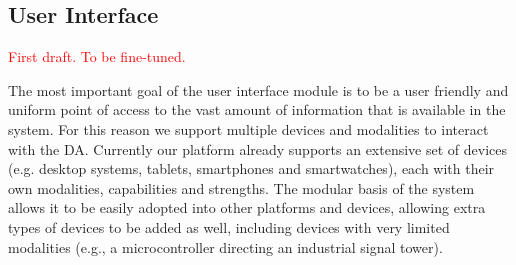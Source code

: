 \subsection{User Interface}\label{sec:UI}

\textcolor{red}{First draft. To be fine-tuned.}

The most important goal of the user interface module is to be a user friendly and uniform point of access to the vast amount of information that is available in the system. For this reason we support multiple devices and modalities to interact with the DA. Currently our platform already supports an extensive set of devices (e.g. desktop systems, tablets, smartphones and smartwatches), each with their own modalities, capabilities and strengths. The modular basis of the system allows it to be easily adopted into other platforms and devices, allowing extra types of devices to be added as well, including devices with very limited modalities (e.g., a microcontroller directing an industrial signal tower).

